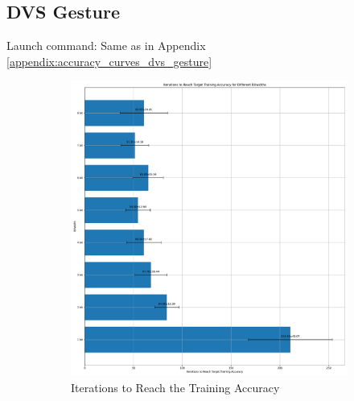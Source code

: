     \subsection{DVS Gesture}
    \label{appendix:iterations_dvs_gesture}
        Launch command: Same as in Appendix \ref{appendix:accuracy_curves_dvs_gesture}
        \begin{figure}[H]
            \centering
            \begin{subfigure}[H]{0.48\textwidth}
                \centering
                \includegraphics[width=\textwidth]{../standard/DVSGesture/plots/dvsgesture_train_iters.pdf}
                \caption{Iterations to Reach the Training Accuracy}
            \end{subfigure}
            \hfill
            \begin{subfigure}[H]{0.48\textwidth}
                \centering

\end{subfigure}
\end{figure}
